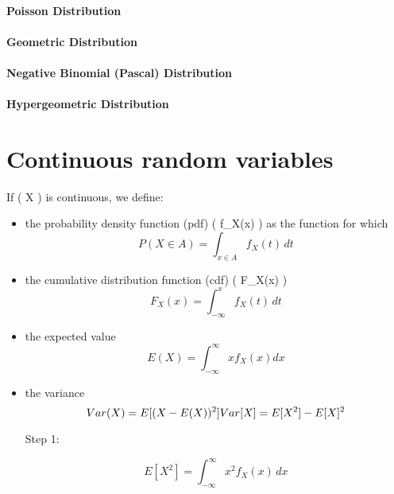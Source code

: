 \documentclass[
  letterpaper,
  DIV=11,
  numbers=noendperiod]{scrreprt}
\begin{document}
\subsubsection{Poisson Distribution}\label{poisson-distribution}

\subsubsection{Geometric Distribution}\label{geometric-distribution}

\subsubsection{Negative Binomial (Pascal)
Distribution}\label{negative-binomial-pascal-distribution}

\subsubsection{Hypergeometric
Distribution}\label{hypergeometric-distribution}

\chapter{}\label{section-1}

\chapter{Continuous random variables}\label{continuous-random-variables}

\begin{tcolorbox}[enhanced jigsaw, bottomrule=.15mm, leftrule=.75mm, colbacktitle=quarto-callout-tip-color!10!white, toptitle=1mm, opacityback=0, titlerule=0mm, colback=white, title=\textcolor{quarto-callout-tip-color}{\faLightbulb}\hspace{0.5em}{Tip}, opacitybacktitle=0.6, left=2mm, rightrule=.15mm, breakable, bottomtitle=1mm, arc=.35mm, coltitle=black, toprule=.15mm, colframe=quarto-callout-tip-color-frame]

If ( X ) is continuous, we define:

\begin{itemize}
\item
  the probability density function (pdf) ( f\_X(x) ) as the function for
  which \[
  P(X \in A) = \int_{x \in A} f_X(t) \, dt
  \]
\item
  the cumulative distribution function (cdf) ( F\_X(x) ) \[
  F_X(x) = \int_{-\infty}^{x} f_X(t) \, dt
  \]
\item
  the expected value \[
  E(X) = \int_{-\infty}^{\infty} x f_X(x) dx
  \]
\item
  the variance \[
  Var(X) = E[(X - E(X))^2 ] \\
  Var[X] = E[X^2] - E[X]^2 \\
  \]

  Step 1:

  \[
  E[X^2] = \int_{-\infty}^{\infty} x^2 f_X(x) \, dx
  \]
\end{itemize}

\end{tcolorbox}
\end{document}
